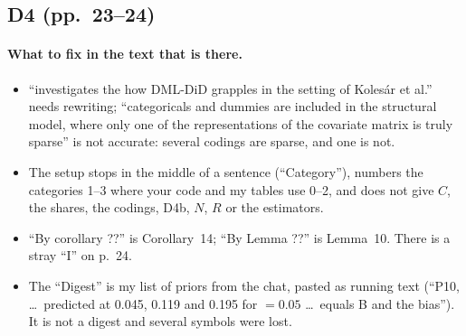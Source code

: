 \documentclass[11pt]{article}
\theoremstyle{plain}
\theoremstyle{remark}
\begin{document}
\subsection{D4 (pp.~23--24)}

\paragraph{What to fix in the text that is there.}
\begin{itemize}
\item ``investigates the how DML-DiD grapples in the setting of Kolesár et al.''
  needs rewriting; ``categoricals and dummies are included in the structural
  model, where only one of the representations of the covariate matrix is truly
  sparse'' is not accurate: several codings are sparse, and one is not.
\item The setup stops in the middle of a sentence (``Category''), numbers the
  categories 1--3 where your code and my tables use 0--2, and does not give
  $C$, the shares, the codings, D4b, $N$, $R$ or the estimators.
\item ``By corollary ??'' is Corollary~14; ``By Lemma ??'' is Lemma~10. There is
  a stray ``I'' on p.~24.
\item The ``Digest'' is my list of priors from the chat, pasted as running text
  (``P10, \dots\ predicted at 0.045, 0.119 and 0.195 for $=0.05$ \dots\ equals B
  and the bias''). It is not a digest and several symbols were lost.
\end{itemize}
\end{document}
